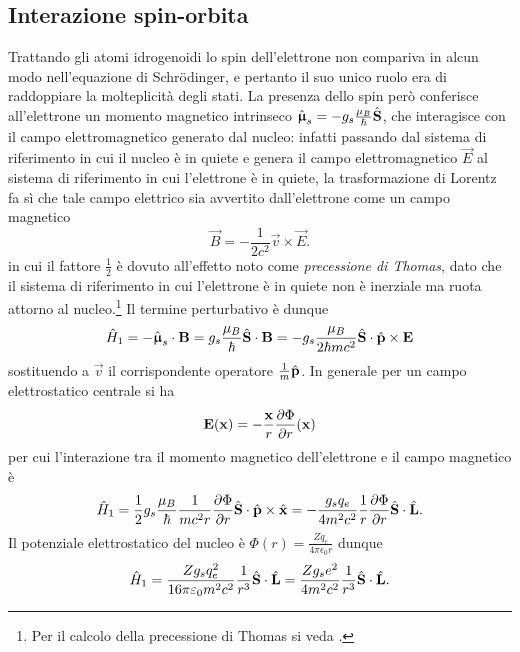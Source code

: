 \subsection{Interazione spin-orbita}
Trattando gli atomi idrogenoidi lo spin dell'elettrone non compariva in alcun modo nell'equazione di Schrödinger, e pertanto il suo unico ruolo era di raddoppiare la molteplicità degli stati.
La presenza dello spin però conferisce all'elettrone un momento magnetico intrinseco $\hat{\bm{\upmu}}_s=-g_s\frac{\mu_B}{\hbar}\hat{\mathbf{S}}$, che interagisce con il campo elettromagnetico generato dal nucleo: infatti passando dal sistema di riferimento in cui il nucleo è in quiete e genera il campo elettromagnetico $\vec E$ al sistema di riferimento in cui l'elettrone è in quiete, la trasformazione di Lorentz fa s\`i che tale campo elettrico sia avvertito dall'elettrone come un campo magnetico
\begin{equation}
    \vec B=-\frac1{2c^2}\vec v\times\vec E.
\end{equation}
in cui il fattore $\frac12$ è dovuto all'effetto noto come \emph{precessione di Thomas}, dato che il sistema di riferimento in cui l'elettrone è in quiete non è inerziale ma ruota attorno al nucleo.\footnote{
    Per il calcolo della precessione di Thomas si veda \cite[app.~O]{eisberg-resnick}.
}
Il termine perturbativo è dunque
\begin{equation}
    \hat{H}_1=
    -{\hat{\bm{\upmu}}_s}\cdot{\mathbf{B}}=
    g_s\frac{\mu_B}{\hbar}{\hat{\mathbf{S}}}\cdot{\mathbf{B}}=
    -g_s\frac{\mu_B}{2\hbar mc^2}{\hat{\mathbf{S}}}\cdot{\hat{\mathbf{p}}\times\mathbf{E}}
\end{equation}
sostituendo a $\vec v$ il corrispondente operatore $\frac1{m}\hat{\mathbf{p}}$.
In generale per un campo elettrostatico centrale si ha
\begin{equation}
    \mathbf{E}(\mathbf{x})=-\frac{\mathbf{x}}{r}\frac{\partial {\Phi}}{\partial {r}}(\mathbf{x})
\end{equation}
per cui l'interazione tra il momento magnetico dell'elettrone e il campo magnetico è
\begin{equation}
    \hat{H}_1=
    \frac12g_s\frac{\mu_B}{\hbar}\frac1{mc^2r}\frac{\partial {\Phi}}{\partial {r}}{\hat{\mathbf{S}}}\cdot{\hat{\mathbf{p}}\times\hat{\mathbf{x}}}=
    -\frac{g_sq_e}{4m^2c^2}\frac1{r}\frac{\partial {\Phi}}{\partial {r}}{\hat{\mathbf{S}}}\cdot{\hat{\mathbf{L}}}.
    \label{eq:interazione-spin-orbita}
\end{equation}
Il potenziale elettrostatico del nucleo è $\Phi(r)=\frac{Zq_e}{4\pi\epsilon_0r}$ dunque
\begin{equation}
    \hat{H}_1=
    \frac{Zg_sq_e^2}{16\pi\varepsilon_0m^2c^2}\frac1{r^3}{\hat{\mathbf{S}}}\cdot{\hat{\mathbf{L}}}=
    \frac{Zg_se^2}{4m^2c^2}\frac1{r^3}{\hat{\mathbf{S}}}\cdot{\hat{\mathbf{L}}}.
    \label{eq:interazione-spin-orbita-coulomb}
\end{equation}
